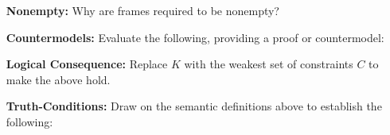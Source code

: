 \documentclass[a4paper, 11pt]{article} %
\begin{document}
\begin{enumerate}[leftmargin=1.2in,itemsep=1pt]\small
	\item[\bf Nonempty:] Why are frames required to be nonempty?
	\item[\bf Countermodels:] Evaluate the following, providing a proof or countermodel:
    \begin{enumerate}[label=\arabic*.,resume]\small
    \end{enumerate}
	\item[\bf Logical Consequence:] Replace $K$ with the weakest set of constraints $C$ to make the above hold. 
	\item[\bf Truth-Conditions:] Draw on the semantic definitions above to establish the following:

\end{enumerate}
\end{document}

